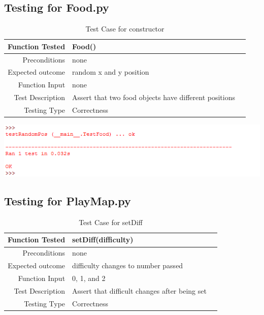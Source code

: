 \documentclass[12pt]{article}
\begin{document}
\subsection{Testing for Food.py}
\begin{center}
	\begin{longtable}{ | r | p{4cm} | p{4cm} }
	\caption{Test Case for constructor} \\ \hline \label{TblInputVar} 
	Function Tested & Food()\\ \hline
	Preconditions & none \\ \hline
	Expected outcome & random x and y position \\ \hline
	Function Input & none \\ \hline
	Test Description & Assert that two food objects have different positions \\ \hline
	Testing Type & Correctness\\ \hline
	
	\end{longtable}
\includegraphics{testFoodResults}\newline\newline	
\end{center}

\subsection{Testing for PlayMap.py}
\begin{center}
	\begin{longtable}{ | r | p{4cm} | p{4cm} }
	\caption{Test Case for setDiff} \\ \hline \label{TblInputVar} 
	Function Tested & setDiff(difficulty)\\ \hline
	Preconditions & none \\ \hline
	Expected outcome & difficulty changes to number passed  \\ \hline
	Function Input & 0, 1, and 2 \\ \hline
	Test Description & Assert that difficult changes after being set\\ \hline
	Testing Type & Correctness\\ \hline
	
	\end{longtable}
\end{center}
\end{document}
